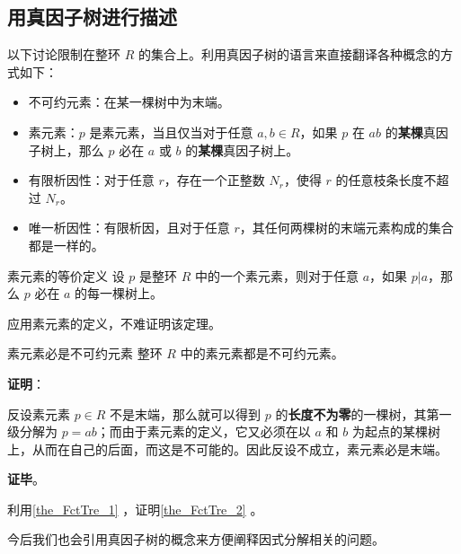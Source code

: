 

\subsection{用真因子树进行描述}

以下讨论限制在整环 $R$ 的集合上。利用真因子树的语言来直接翻译各种概念的方式如下：

\begin{definition}{}\label{def_FctTre_1}
\begin{itemize}
\item 不可约元素：在某一棵树中为末端。
\item 素元素：$p$ 是素元素，当且仅当对于任意 $a, b\in R$，如果 $p$ 在 $ab$ 的\textbf{某棵}真因子树上，那么 $p$ 必在 $a$ 或 $b$ 的\textbf{某棵}真因子树上。
\item 有限析因性：对于任意 $r$，存在一个正整数 $N_r$，使得 $r$ 的任意枝条长度不超过 $N_r$。
\item 唯一析因性：有限析因，且对于任意 $r$，其任何两棵树的末端元素构成的集合都是一样的。
\end{itemize}
\end{definition}

\begin{theorem}{素元素的等价定义}\label{the_FctTre_1}
设 $p$ 是整环 $R$ 中的一个素元素，则对于任意 $a$，如果 $p|a$，那么 $p$ 必在 $a$ 的每一棵树上。
\end{theorem}

应用素元素的定义，不难证明该定理。


\begin{theorem}{素元素必是不可约元素}\label{the_FctTre_2}
整环 $R$ 中的素元素都是不可约元素。
\end{theorem}

\textbf{证明}：

反设素元素 $p\in R$ 不是末端，那么就可以得到 $p$ 的\textbf{长度不为零}的一棵树，其第一级分解为 $p=ab$；而由于素元素的定义，它又必须在以 $a$ 和 $b$ 为起点的某棵树上，从而在自己的后面，而这是不可能的。因此反设不成立，素元素必是末端。

\textbf{证毕}。

\begin{exercise}{}\label{exe_FctTre_1}
利用\autoref{the_FctTre_1} ，证明\autoref{the_FctTre_2} 。
\end{exercise}

今后我们也会引用真因子树的概念来方便阐释因式分解相关的问题。

